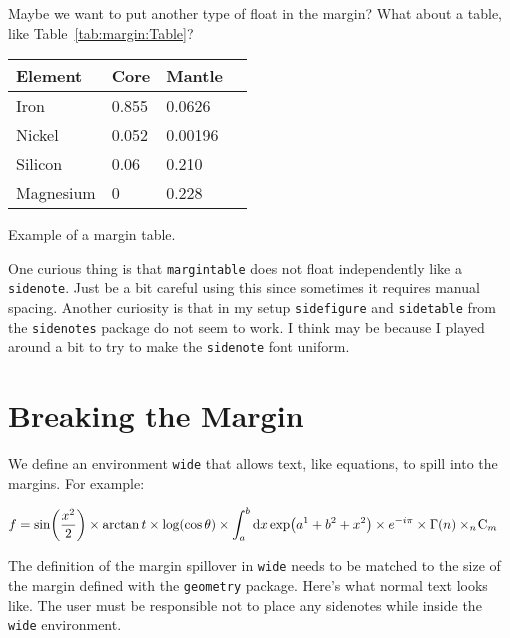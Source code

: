 Maybe we want to put another type of float in the margin?
What about a table, like Table~\ref{tab:margin:Table}?
% 
\begin{margintable}[-1em]
\small
    \begin{tabular}{ @{} llll @{} } \toprule %
        Element 
        & Core
        & Mantle
        \\ \hline
        Iron 
        & 0.855 
        & 0.0626 
        \\
        Nickel 
        & 0.052 
        & 0.00196 
        \\
        Silicon 
        & 0.06 
        & 0.210 
        \\
        Magnesium 
        & 0 
        & 0.228 
        \\ \bottomrule
    \end{tabular}
    \caption{Example of a margin table.}
    \label{tab:margin:Table}
\end{margintable}
One curious thing is that \texttt{margintable} does not float independently like a \texttt{sidenote}. Just be a bit careful using this since sometimes it requires manual spacing.
Another curiosity is that in my setup \texttt{sidefigure} and \texttt{sidetable} from the \texttt{sidenotes} package do not seem to work. I think may be because I played around a bit to try to make the \texttt{sidenote} font uniform.

\section{Breaking the Margin}


We define an environment \texttt{wide} that allows text, like equations, to spill into the margins. For example:
\begin{wide}
\begin{align}
f &= \sin\mleft(\frac{x^2}{2}\mright)
\times \arctan t 
\times \log \mleft(\cos \theta\mright)
\times \int_a^b \D{}x \exp\mleft(a^1 + b^2 + x^2\mright)
\times e^{-i\pi} 
\times \Gamma(n) 
\times _{n\!}\text{C}_m
\end{align}
\end{wide}
\begin{wide}
The definition of the margin spillover in \texttt{wide} needs to be matched to the size of the margin defined with the \texttt{geometry} package. Here's what normal text looks like.  The user must be responsible not to place any sidenotes while inside the \texttt{wide} environment.
\end{wide}


